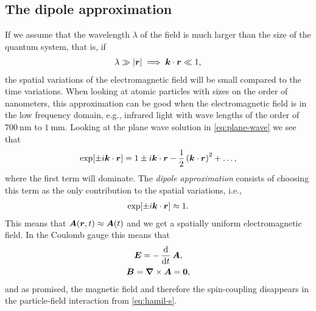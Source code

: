         \subsection{The dipole approximation}
            If we assume that the wavelength $\lambda$ of the field is much
            larger than the size of the quantum system, that is, if
            \begin{align}
                \lambda \gg \abs{\boldsymbol{r}}
                \implies
                \boldsymbol{k}\cdot\boldsymbol{r} \ll 1,
            \end{align}
            the spatial variations of the electromagnetic field will be small
            compared to the time variations.
            When looking at atomic particles with sizes on the order of
            nanometers, this approximation can be good when the electromagnetic
            field is in the low frequency domain, e.g., infrared light with wave
            lengths of the order of $\SI{700}{\nano\meter}$ to
            $\SI{1}{\milli\meter}$.
            Looking at the plane wave solution in \autoref{eq:plane-wave} we see
            that
            \begin{align}
                \exp[\pm i\boldsymbol{k}\cdot\boldsymbol{r}]
                = 1 \pm i\boldsymbol{k}\cdot\boldsymbol{r}
                - \frac{1}{2}\left( 
                    \boldsymbol{k}\cdot\boldsymbol{r}
                 \right)^2
                + \dots,
            \end{align}
            where the first term will dominate.
            The \emph{dipole approximation} consists of choosing this term as
            the only contribution to the spatial variations, i.e.,
            \begin{align}
                \exp[\pm i\boldsymbol{k}\cdot\boldsymbol{r}] \approx 1.
            \end{align}
            This means that $\boldsymbol{A}(\boldsymbol{r}, t) \approx \boldsymbol{A}(t)$ and we get
            a spatially uniform electromagnetic field.
            In the Coulomb gauge this means that
            \begin{gather}
                \vfg{E} = -\dod{}{t}\vfg{A},
                \label{eq:electric-field-dipole}
                \\
                \vfg{B} = \vfg{\nabla}\times \vfg{A} = \vfg{0},
            \end{gather}
            and as promised, the magnetic field and therefore the spin-coupling
            disappears in the particle-field interaction from
            \autoref{eq:hamil-s}.

